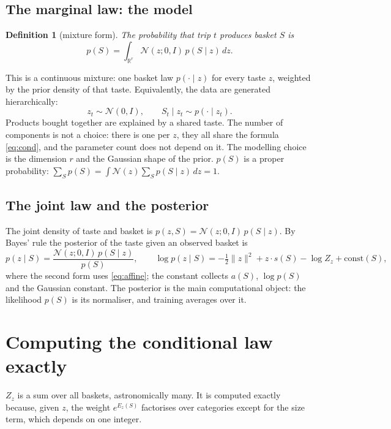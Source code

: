 \documentclass[11pt,a4paper]{article}
\newtheorem{definition}{Definition}
\theoremstyle{remark}
\newcommand{\N}{\mathcal N}
\newcommand{\R}{\mathbb R}
\begin{document}
\subsection{The marginal law: the model}

\begin{definition}[mixture form]
The probability that trip $t$ produces basket $S$ is
\begin{equation}
p(S)=\int_{\R^r}\N(z;0,I)\,p(S\mid z)\,dz .
\label{eq:marginal}
\end{equation}
\end{definition}
This is a continuous mixture: one basket law $p(\cdot\mid z)$ for every taste $z$, weighted by the prior
density of that taste. Equivalently, the data are generated hierarchically:
\[
z_t\sim\N(0,I),\qquad S_t\mid z_t\sim p(\cdot\mid z_t).
\]
Products bought together are explained by a shared taste. The number of components is not a choice:
there is one per $z$, they all share the formula \eqref{eq:cond}, and the parameter count does not depend
on it. The modelling choice is the dimension $r$ and the Gaussian shape of the prior. $p(S)$ is a proper
probability: $\sum_S p(S)=\int\N(z)\sum_S p(S\mid z)\,dz=1$.

\subsection{The joint law and the posterior}

The joint density of taste and basket is $p(z,S)=\N(z;0,I)\,p(S\mid z)$. By Bayes' rule the posterior of
the taste given an observed basket is
\begin{equation}
p(z\mid S)=\frac{\N(z;0,I)\,p(S\mid z)}{p(S)},\qquad
\log p(z\mid S)=-\tfrac12\lVert z\rVert^2+z\cdot s(S)-\log Z_z+\text{const}(S),
\label{eq:post}
\end{equation}
where the second form uses \eqref{eq:affine}; the constant collects $a(S)$, $\log p(S)$ and the Gaussian
constant. The posterior is the main computational object: the likelihood $p(S)$ is its normaliser, and
training averages over it.

\section{Computing the conditional law exactly}
\label{sec:dp}

$Z_z$ is a sum over all baskets, astronomically many. It is computed exactly because, given $z$, the
weight $e^{E_z(S)}$ factorises over categories except for the size term, which depends on one integer.
\end{document}
